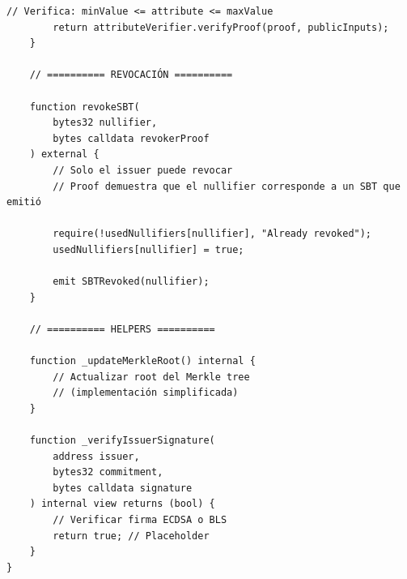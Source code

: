 \documentclass[11pt,a4paper,twoside]{book}
\theoremstyle{definition}
\theoremstyle{remark}
\begin{document}
\begin{lstlisting}[language=Solidity, caption={Private SBT Registry con ZK}]
        // Verifica: minValue <= attribute <= maxValue
        return attributeVerifier.verifyProof(proof, publicInputs);
    }
    
    // ========== REVOCACIÓN ==========
    
    function revokeSBT(
        bytes32 nullifier,
        bytes calldata revokerProof
    ) external {
        // Solo el issuer puede revocar
        // Proof demuestra que el nullifier corresponde a un SBT que emitió
        
        require(!usedNullifiers[nullifier], "Already revoked");
        usedNullifiers[nullifier] = true;
        
        emit SBTRevoked(nullifier);
    }
    
    // ========== HELPERS ==========
    
    function _updateMerkleRoot() internal {
        // Actualizar root del Merkle tree
        // (implementación simplificada)
    }
    
    function _verifyIssuerSignature(
        address issuer,
        bytes32 commitment,
        bytes calldata signature
    ) internal view returns (bool) {
        // Verificar firma ECDSA o BLS
        return true; // Placeholder
    }
}
\end{lstlisting}
\end{document}
